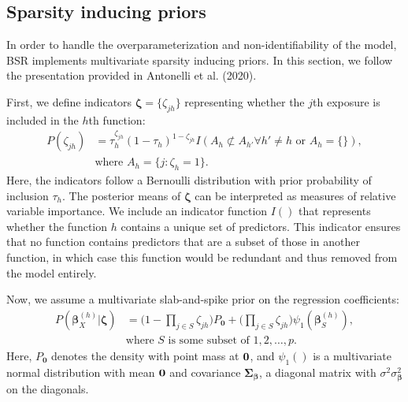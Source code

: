 \documentclass[12pt, twoside]{amherstthesis}
\begin{document}
\hypertarget{sparsity-inducing-priors}{%
\subsection{Sparsity inducing priors}\label{sparsity-inducing-priors}}

In order to handle the overparameterization and non-identifiability of the model, BSR implements multivariate sparsity inducing priors. In this section, we follow the presentation provided in Antonelli et al. (2020).

First, we define indicators \(\boldsymbol\zeta=\{\zeta_{jh}\}\) representing whether the \(j\)th exposure is included in the \(h\)th function:
\begin{align*}
P(\zeta_{jh}) &= \tau_h^{\zeta_{jh}}(1-\tau_h)^{1-\zeta_{jh}} 
I(A_h\not\subset A_{h'}\forall h'\neq h \textrm{ or } A_h=\{\}),\\
&\textrm{where } A_h=\{j:\zeta_h=1\}.
\end{align*}
\noindent Here, the indicators follow a Bernoulli distribution with prior probability of inclusion \(\tau_h\). The posterior means of \(\boldsymbol\zeta\) can be interpreted as measures of relative variable importance. We include an indicator function \(I()\) that represents whether the function \(h\) contains a unique set of predictors. This indicator ensures that no function contains predictors that are a subset of those in another function, in which case this function would be redundant and thus removed from the model entirely.

Now, we assume a multivariate slab-and-spike prior on the regression coefficients:
\begin{align*}
P(\boldsymbol\beta_X^{(h)}|\boldsymbol\zeta) &= \bigg(1-\prod_{j\in S}\zeta_{jh}\bigg)P_{\textbf{0}} +
\bigg(\prod_{j\in S}\zeta_{jh}\bigg) \psi_1(\boldsymbol\beta_S^{(h)}), \\
&\textrm{where } S \textrm{ is some subset of } {1, 2, \dots, p}.
\end{align*}
\noindent Here, \(P_{\textbf{0}}\) denotes the density with point mass at \(\textbf0\), and \(\psi_1()\) is a multivariate normal distribution with mean \(\textbf0\) and covariance \(\boldsymbol\Sigma_{\boldsymbol\beta}\), a diagonal matrix with \(\sigma^2\sigma_{\boldsymbol\beta}^2\) on the diagonals.
\end{document}
